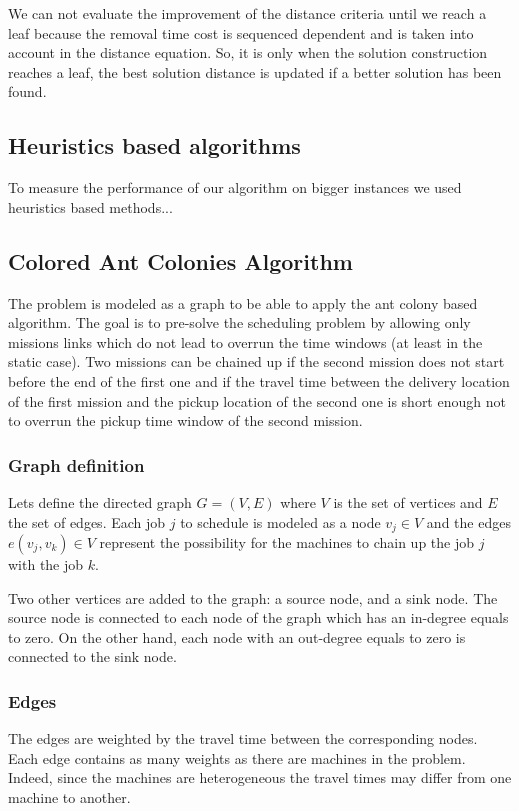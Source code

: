 \documentclass[a4paper,10pt]{article}
\begin{document}
  We can not evaluate the improvement of the distance criteria until we reach a leaf because the removal time cost is sequenced dependent and is taken into account in the distance equation. So, it is only when the solution construction reaches a leaf, the best solution distance is updated if a better solution has been found.
  
   \subsection{Heuristics based algorithms}
  To measure the performance of our algorithm on bigger instances we used heuristics based methods...

   \subsection{Colored Ant Colonies Algorithm}

The problem is modeled as a graph to be able to apply the ant colony based algorithm. The goal is to pre-solve the scheduling problem by allowing only missions links which do not lead to overrun the time windows (at least in the static case). Two missions can be chained up if the second mission does not start before the end of the first one and if the travel time between the delivery location of the first mission and the pickup location of the second one is short enough not to overrun the pickup time window of the second mission.

\subsubsection{Graph definition}

Lets define the directed graph $G = (V,E)$ where $V$ is the set of vertices and $E$ the set of edges. Each job $j$ to schedule is modeled as a node $v_j \in V$ and the edges $e(v_j,v_k) \in V$ represent the possibility for the machines to chain up the job $j$ with the job $k$.

Two other vertices are added to the graph: a source node, and a sink node. The source node is connected to each node of the graph which has an in-degree equals to zero. On the other hand, each node with an out-degree equals to zero is connected to the sink node. %


\subsubsection{Edges}
The edges are weighted by the travel time between the corresponding nodes. Each edge contains as many weights as there are machines in the problem. Indeed, since the machines are heterogeneous the travel times may differ from one machine to another.
\end{document}
